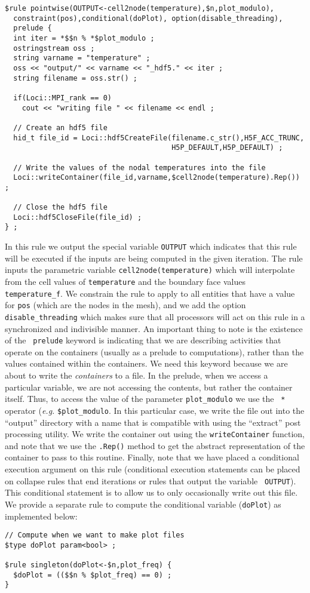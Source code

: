 \documentclass[10pt,epsf,letterpaper,twoside]{book}
\begin{document}
\newpage
\begin{verbatim}
$rule pointwise(OUTPUT<-cell2node(temperature),$n,plot_modulo),
  constraint(pos),conditional(doPlot), option(disable_threading),
  prelude {
  int iter = *$$n % *$plot_modulo ;
  ostringstream oss ;
  string varname = "temperature" ;
  oss << "output/" << varname << "_hdf5." << iter ;
  string filename = oss.str() ;

  if(Loci::MPI_rank == 0)
    cout << "writing file " << filename << endl ;

  // Create an hdf5 file
  hid_t file_id = Loci::hdf5CreateFile(filename.c_str(),H5F_ACC_TRUNC,
                                       H5P_DEFAULT,H5P_DEFAULT) ;

  // Write the values of the nodal temperatures into the file
  Loci::writeContainer(file_id,varname,$cell2node(temperature).Rep()) ;

  // Close the hdf5 file
  Loci::hdf5CloseFile(file_id) ;
} ;
\end{verbatim}
In this rule we output the special variable {\tt OUTPUT} which
indicates that this rule will be executed if the inputs are being
computed in the given iteration.  The rule inputs the parametric
variable {\tt cell2node(temperature)} which will interpolate from the
cell values of {\tt temperature} and the boundary face values {\tt
  temperature\_f}.  We constrain the rule to apply to all entities that
have a value for {\tt pos} (which are the nodes in the mesh), and we
add the option {\tt disable\_threading} which makes sure that all
processors will act on this rule in a synchronized and indivisible
manner.  An important thing to note is the existence of the {\tt
  prelude} keyword is indicating that we are describing activities
that operate on the containers (usually as a prelude to computations),
rather than the values contained within the containers.  We need this
keyword because we are about to write the {\it containers} to a file.
In the prelude, when we access a particular variable, we are not
accessing the contents, but rather the container itself.  Thus, to
access the value of the parameter {\tt plot\_modulo} we use the {\tt
  *} operator ({\it e.g.} {\tt *\$plot\_modulo}.  In this particular
case, we write the file out into the ``output'' directory with a name
that is compatible with using the ``extract'' post processing
utility.  We write the container out using the {\tt writeContainer}
function, and note that we use the {\tt .Rep()} method to get the
abstract representation of the container to pass to this routine.
Finally, note that we have placed a conditional execution argument on
this rule (conditional execution statements can be placed on collapse
rules that end iterations or rules that output the variable {\tt
  OUTPUT}).  This conditional statement is to allow us to only
occasionally write out this file.  We provide a separate rule to
compute the conditional variable ({\tt doPlot}) as implemented below:
\newpage
\begin{verbatim}
// Compute when we want to make plot files
$type doPlot param<bool> ;

$rule singleton(doPlot<-$n,plot_freq) {
  $doPlot = (($$n % $plot_freq) == 0) ;
}
\end{verbatim}
\end{document}
